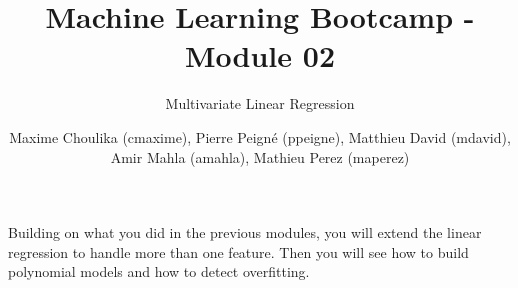\documentclass{42-en}
\begin{document}

\title{Machine Learning Bootcamp - Module 02}
\subtitle{Multivariate Linear Regression}
\author{
  Maxime Choulika (cmaxime), Pierre Peigné (ppeigne), Matthieu David (mdavid), 
  Amir Mahla (amahla), Mathieu Perez (maperez)
}

\summary
{
  Building on what you did in the previous modules, you will extend the linear regression to handle more than one feature.
  Then you will see how to build polynomial models and how to detect overfitting.
}

\maketitle


\newpage
\tableofcontents
\startexercices



\end{document}
